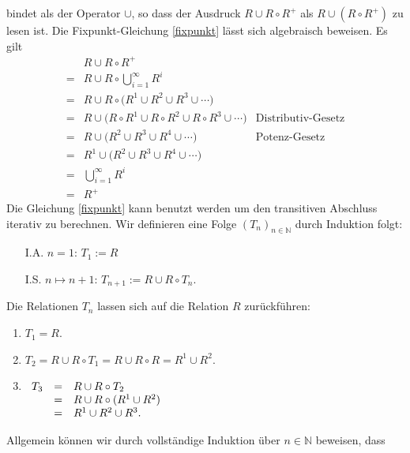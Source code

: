 bindet als der Operator $\cup$, so dass der Ausdruck $R \cup R \circ R^+$ als
$R \cup (R \circ R^+)$ zu lesen ist.
Die Fixpunkt-Gleichung \ref{fixpunkt} l\"{a}sst sich algebraisch beweisen.  Es gilt
\[
\begin{array}{cll}
    & R \cup R \circ R^+ \\[0.2cm]
  = & R \cup R \circ \bigcup\limits_{i=1}^{\infty} R^i \\[0.4cm]
  = & R \cup R \circ \bigl(R^1 \cup R^2 \cup R^3 \cup \cdots \bigr) \\[0.2cm]
  = & R \cup \bigl(R \circ R^1 \cup R \circ R^2 \cup R \circ R^3 \cup \cdots \bigr) &
      \mbox{Distributiv-Gesetz} \\[0.2cm]
  = & R \cup \bigl(R^2 \cup R^3 \cup  R^4 \cup \cdots \bigr) & \mbox{Potenz-Gesetz} \\[0.2cm]
  = & R^1 \cup \bigl(R^2 \cup R^3 \cup  R^4 \cup \cdots \bigr) \\[0.2cm]
  = & \bigcup\limits_{i=1}^{\infty} R^i \\[0.4cm]
  = & R^+
\end{array}
\]
Die Gleichung \ref{fixpunkt} kann benutzt werden um den transitiven Abschluss iterativ zu
berechnen.  Wir definieren eine Folge $(T_n)_{n \in \mathbb{N}}$ durch Induktion folgt:
\begin{enumerate}
\item[I.A.] $n = 1$:         \hspace*{2.3cm} $T_1 := R$
\item[I.S.] $n \mapsto n+1$: \hspace*{1.6cm} $T_{n+1} := R \cup R \circ T_n$. 
\end{enumerate}
Die Relationen $T_n$ lassen sich auf die Relation $R$ zur\"{u}ckf\"{u}hren:
\begin{enumerate}
\item $T_1 = R$.
\item $T_2 = R \cup R \circ T_1 = R \cup R \circ R = R^1 \cup R^2$.
\item $\begin{array}[t]{lcl}
       T_3  & = & R \cup R \circ T_2 \\
            & = & R \cup R \circ (R^1 \cup R^2) \\
            & = & R^1 \cup R^2 \cup R^3. \\
       \end{array}
      $
\end{enumerate}
Allgemein k\"{o}nnen wir durch vollst\"{a}ndige Induktion \"{u}ber $n \in \mathbb{N}$ beweisen, dass
